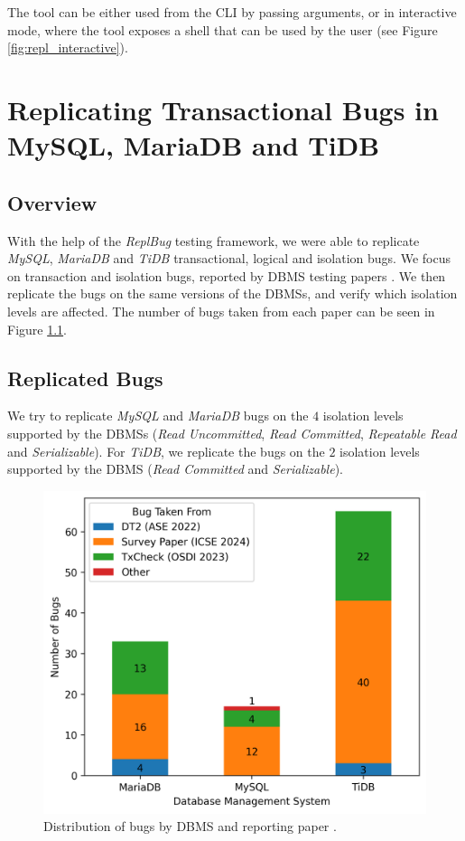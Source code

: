 The tool can be either used from the CLI by passing arguments, or in interactive mode, where the tool exposes a shell that can be used by the user  (see Figure \ref{fig:repl_interactive}).

\chapter{Replicating Transactional Bugs in MySQL, MariaDB and TiDB}

\section{Overview}

With the help of the \textit{ReplBug} testing framework, we were able to replicate \textit{MySQL}, \textit{MariaDB} and \textit{TiDB} transactional, logical and isolation bugs. We focus on transaction and isolation bugs, reported by DBMS testing papers \cite{cui2024understanding_ICSE2024, dou2023detecting_ICSE2023, cui2022differentially_ASE2022}. We then replicate the bugs on the same versions of the DBMSs, and verify which isolation levels are affected. The number of bugs taken from each paper can be seen in Figure \ref{fig:bugs_by_paper}.

\section{Replicated Bugs}


We try to replicate \textit{MySQL} and \textit{MariaDB} bugs on the $4$ isolation levels supported by the DBMSs (\textit{Read Uncommitted}, \textit{Read Committed}, \textit{Repeatable Read} and \textit{Serializable}). For \textit{TiDB}, we replicate the bugs on the $2$ isolation levels supported by the DBMS (\textit{Read Committed} and \textit{Serializable}).

\begin{figure}
    \centering
    \includegraphics[width=0.8\linewidth]{assets/bug_replication_bugs_by_dbms_and_paper.png}
    \caption{Distribution of bugs by DBMS and reporting paper  \cite{cui2024understanding_ICSE2024, dou2023detecting_ICSE2023, cui2022differentially_ASE2022}.}
    \label{fig:bugs_by_paper}
\end{figure}

